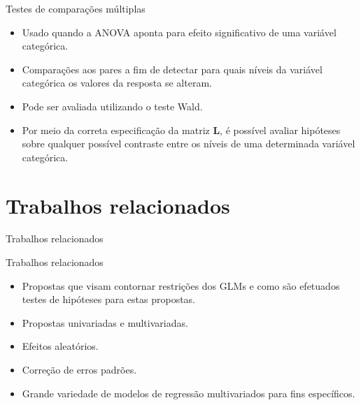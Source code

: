 \documentclass[
  ignorenonframetext,
  serif,
  professionalfont,
  usenames,
  dvipsnames,
  aspectratio = 169]{beamer}
\begin{document}
\begin{frame}{Testes de comparações múltiplas}
\protect\hypertarget{testes-de-comparauxe7uxf5es-muxfaltiplas-1}{}
\begin{itemize}

  \itemsep 2ex

  \item Usado quando a ANOVA aponta para efeito significativo de uma variável categórica.

  \item Comparações aos pares a fim de detectar para quais níveis da variável categórica os valores da resposta se alteram.

  \item Pode ser avaliada utilizando o teste Wald. 

  \item Por meio da correta especificação da matriz $\boldsymbol{L}$, é possível avaliar hipóteses sobre qualquer possível contraste entre os níveis de uma determinada variável categórica. 

\end{itemize}
\end{frame}

\hypertarget{trabalhos-relacionados}{%
\section{Trabalhos relacionados}\label{trabalhos-relacionados}}

\begin{frame}{Trabalhos relacionados}
\end{frame}

\begin{frame}{Trabalhos relacionados}
\protect\hypertarget{trabalhos-relacionados-1}{}
\begin{itemize}
  \itemsep 2ex
  
  \item Propostas que visam contornar restrições dos GLMs e como são efetuados testes de hipóteses para estas propostas.
  
  \item Propostas univariadas e multivariadas.
  
  \item Efeitos aleatórios.
  
  \item Correção de erros padrões.
  
  \item Grande variedade de modelos de regressão multivariados para fins específicos.
  
\end{itemize}
\end{frame}
\end{document}
